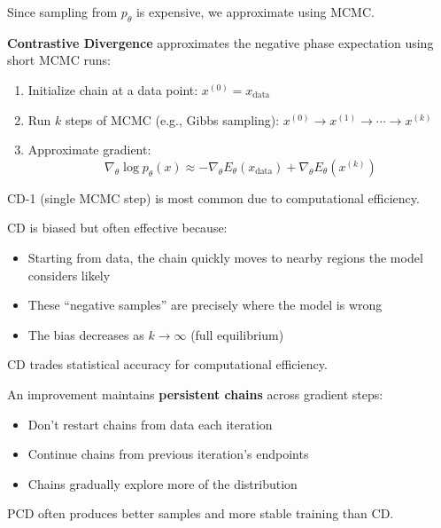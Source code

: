 Since sampling from $p_\theta$ is expensive, we approximate using MCMC.

\begin{definition}
    \textbf{Contrastive Divergence} approximates the negative phase expectation using short MCMC runs:
    \begin{enumerate}
        \item Initialize chain at a data point: $x^{(0)} = x_{\text{data}}$
        \item Run $k$ steps of MCMC (e.g., Gibbs sampling): $x^{(0)} \to x^{(1)} \to \cdots \to x^{(k)}$
        \item Approximate gradient:
        \[
            \nabla_\theta \log p_\theta(x) \approx -\nabla_\theta E_\theta(x_{\text{data}}) + \nabla_\theta E_\theta(x^{(k)})
        \]
    \end{enumerate}
    CD-1 (single MCMC step) is most common due to computational efficiency.
\end{definition}

\begin{remark}
    CD is biased but often effective because:
    \begin{itemize}
        \item Starting from data, the chain quickly moves to nearby regions the model considers likely
        \item These ``negative samples'' are precisely where the model is wrong
        \item The bias decreases as $k \to \infty$ (full equilibrium)
    \end{itemize}
    CD trades statistical accuracy for computational efficiency.
\end{remark}

\begin{remark}
    An improvement maintains \textbf{persistent chains} across gradient steps:
    \begin{itemize}
        \item Don't restart chains from data each iteration
        \item Continue chains from previous iteration's endpoints
        \item Chains gradually explore more of the distribution
    \end{itemize}
    PCD often produces better samples and more stable training than CD.
\end{remark}

